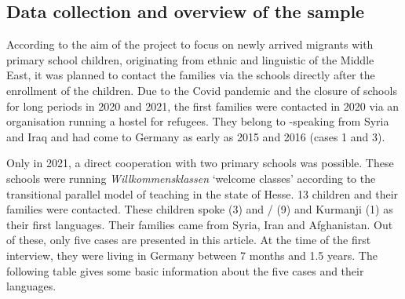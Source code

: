 \documentclass[output=paper,colorlinks,citecolor=brown]{langscibook}
\begin{document}
\subsection{Data collection and overview of the sample}\label{ch2.5.ss.4.1}

According to the aim of the project to focus on newly arrived migrants with primary school children, originating from ethnic and linguistic  of the Middle East, it was planned to contact the families via the  schools directly after the enrollment of the children. Due to the Covid pandemic and the closure of schools for long periods in 2020 and 2021, the first families were contacted in 2020 via an organisation running a hostel for refugees. They belong to -speaking  from Syria and Iraq and had come to Germany as early as 2015 and 2016 (cases 1 and 3). 

Only in 2021, a direct cooperation with two primary schools was possible. These schools were running \textit{Willkommensklassen} `welcome classes' according to the transitional parallel model of teaching in the  state of Hesse. 13 children and their families were contacted. These children spoke  (3) and / (9) and Kurmanji  (1) as their first languages. Their families came from Syria, Iran and Afghanistan. Out of these, only five cases are presented in this article. At the time of the first interview, they were living in Germany between 7 months and 1.5 years. The following table gives some basic information about the five cases and their languages.
\end{document}

